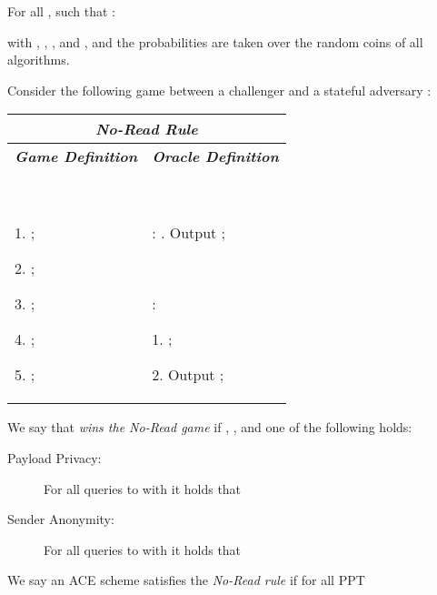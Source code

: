 \documentclass{llncs}
\begin{document}
\begin{defi}[Correctness] \label{def:ACE-correct}\label{def:one-correct}
For all ,  such that :


with , , , and , and the probabilities are taken over the random coins of all algorithms.
\end{defi}







\begin{defi} \label{def:oneprivacy}\label{def:ACEnoread} \label{def:privacy} Consider the following game between a challenger  and a stateful adversary :
\begin{center}
\begin{small}
    \begin{tabular}{| p{5.5cm} | p{5cm} |}
    \hline
	\multicolumn{2}{|c|}{\textbf{\emph{No-Read Rule}}} \\
	\hline
	\multicolumn{1}{|c|}{\textbf{\emph{Game Definition}}} & \multicolumn{1}{|c|}{\textbf{\emph{Oracle Definition}}}  \\
	\hline
	\

	1. ;

	2. ;

	3. ;

	4. ;

	5. ;

	&
	\

	: \newline 1. Output ;

	\ 

	: 

	1. ;

	2. Output ;

	\\
	\hline
	\end{tabular}
\end{small}
\end{center}
We say that  \emph{wins the No-Read game} if , ,  and one of the following holds:
\begin{description}
	\item[Payload Privacy:] For all queries  to  with  it holds that 
		
	\item[Sender Anonymity:] For all queries  to  with  it holds that 
		
\end{description}
We say an ACE scheme satisfies the \emph{No-Read rule} if for all PPT 
 
\end{defi}
\end{document}
